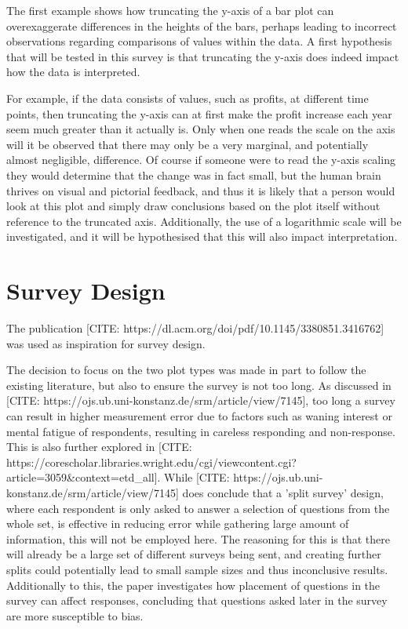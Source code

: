 The first example shows how truncating the y-axis of a bar plot can overexaggerate differences in the heights of the bars, perhaps leading to incorrect 
observations regarding comparisons of values within the data. A first hypothesis that will be tested in this survey is that truncating the y-axis
does indeed impact how the data is interpreted.

For example, if the data consists of values, such as profits, at different time points, then truncating 
the y-axis can at first make the profit increase each year seem much greater than it actually is. Only when one reads the scale on the 
axis will it be observed that there may only be a very marginal, and potentially almost negligible, difference. Of course if someone 
were to read the y-axis scaling they would determine that the change was in fact small, but the human brain thrives on visual and 
pictorial feedback, and thus it is likely that a person would look at this plot and simply draw conclusions based on the plot itself
without reference to the truncated axis.  Additionally, the use of a logarithmic scale will be investigated, and it will
be hypothesised that this will also impact interpretation.



\section{Survey Design}

The publication [CITE: https://dl.acm.org/doi/pdf/10.1145/3380851.3416762] was used as inspiration for survey design.

The decision to focus on the two plot types was made in part to follow the existing literature, but also to ensure the survey is not too long. 
As discussed in [CITE: https://ojs.ub.uni-konstanz.de/srm/article/view/7145], too long a survey can result in higher measurement error due to factors 
such as waning interest or mental fatigue of respondents, resulting in careless responding and non-response. This is also further explored in 
[CITE: https://corescholar.libraries.wright.edu/cgi/viewcontent.cgi?article=3059&context=etd_all]. While 
[CITE: https://ojs.ub.uni-konstanz.de/srm/article/view/7145] does conclude that a 'split survey' design, where each respondent is only asked to 
answer a selection of questions from the whole set, is effective in reducing error while gathering large amount of information, this will not be employed
here. The reasoning for this is that there will already be a large set of different surveys being sent, and creating further splits could potentially lead
to small sample sizes and thus inconclusive results. Additionally to this, the paper investigates how placement of questions in the survey can affect
responses, concluding that questions asked later in the survey are more susceptible to bias. 

